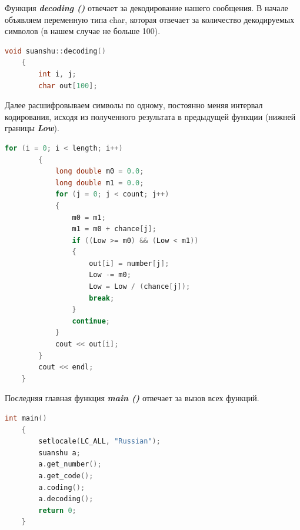 \documentclass[12pt]{article}
\begin{document}
Функция \textbf{\textit{decoding ()}} отвечает за декодирование нашего сообщения. В начале объявляем переменную типа char, которая отвечает за количество декодируемых символов (в нашем случае не больше 100).

\begin{lstlisting}[language=C,style=C]
    void suanshu::decoding()
    {   
        int i, j;
        char out[100];

\end{lstlisting}

Далее расшифровываем символы по одному, постоянно меняя интервал кодирования, исходя из полученного результата в предыдущей функции (нижней границы \textbf{\textit{Low}}).

\begin{lstlisting}[language=C,style=C]
        for (i = 0; i < length; i++)
        {
            long double m0 = 0.0;
            long double m1 = 0.0;
            for (j = 0; j < count; j++)
            {
                m0 = m1;
                m1 = m0 + chance[j];
                if ((Low >= m0) && (Low < m1))
                {
                    out[i] = number[j];
                    Low -= m0;
                    Low = Low / (chance[j]);
                    break;
                }
                continue;
            }
            cout << out[i];
        }
        cout << endl;
    }

\end{lstlisting}

Последняя главная функция \textbf{\textit{main ()}} отвечает за вызов всех функций.

\begin{lstlisting}[language=C,style=C]
    int main()
    {
        setlocale(LC_ALL, "Russian");
        suanshu a;
        a.get_number();
        a.get_code();
        a.coding();
        a.decoding();
        return 0;
    }

\end{lstlisting}
\newpage





\nocite{*}
\printbibliography
\end{document}
